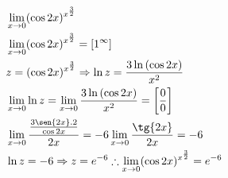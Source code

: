 \begin{ex}
\begin{align}
&\lim_{x\rightarrow 0} (\cos{2x})^{x^{\frac{3}{2}}}\nonumber\\
&\lim_{x\rightarrow 0} (\cos{2x})^{x^{\frac{3}{2}}}=[1^{\infty}]\nonumber\\
&z=(\cos{2x})^{{x^{\frac{3}{2}}}} \Rightarrow \ln{z}=\frac{3\ln{(\cos{2x})}}{x^2}\nonumber\\
&\lim_{x\rightarrow 0} \ln{z}=\lim_{x\rightarrow 0} \frac{3\ln{(\cos{2x})}}{x^2}=\left[\frac{0}{0}\right]\nonumber\\
&\lim_{x\rightarrow 0} \frac{\frac{3\sen{2x}.2}{\cos{2x}}}{2x}=-6\lim_{x\rightarrow 0} \frac{\tg{2x}}{2x}=-6\nonumber\\
&\ln{z}=-6 \Rightarrow z=e^{-6} \therefore \lim_{x\rightarrow 0} (\cos{2x})^{x^{\frac{3}{2}}}=e^{-6}\nonumber
\end{align}
\end{ex}